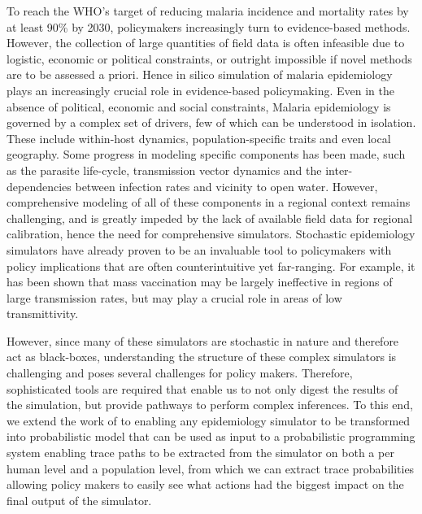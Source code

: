 \documentclass{article}
\begin{document}
To reach the WHO’s target of reducing malaria incidence and mortality rates by at least 90\% by 2030, policymakers increasingly turn to evidence-based methods. 
However, the collection of large quantities of field data is often infeasible due to logistic, economic or political constraints, or outright impossible if novel methods are to be assessed a priori. 
Hence in silico simulation of malaria epidemiology plays an increasingly crucial role in evidence-based policymaking.
Even in the absence of political, economic and social constraints, Malaria epidemiology is governed by a complex set of drivers, few of which can be understood in isolation.
These include within-host dynamics, population-specific traits and even local geography.
Some progress in modeling specific components has been made, such as the parasite life-cycle, transmission vector dynamics and the inter-dependencies between infection rates and vicinity to open water. 
However, comprehensive modeling of all of these components in a regional context remains challenging, and is greatly impeded by the lack of available field data for regional calibration, hence the need for comprehensive simulators.
Stochastic epidemiology simulators have already proven to be an invaluable tool to policymakers with policy implications that are often counterintuitive yet far-ranging. 
For example, it has been shown that mass vaccination may be largely ineffective in regions of large transmission rates, but may play a crucial role in areas of low transmittivity.

However, since many of these simulators are stochastic in nature and therefore act as black-boxes, understanding the structure of these complex simulators is challenging and poses several challenges for policy makers. 
Therefore, sophisticated tools are required that enable us to not only digest the results of the simulation, but provide pathways to perform complex inferences. 
To this end, we extend the work of \citep{baydin2018efficient} to enabling any epidemiology simulator to be transformed into probabilistic model that can be used as input to a probabilistic programming system enabling trace paths to be extracted from the simulator on both a per human level and a population level, from which we can extract trace probabilities allowing policy makers to easily see what actions had the biggest impact on the final output of the simulator.
\end{document}
